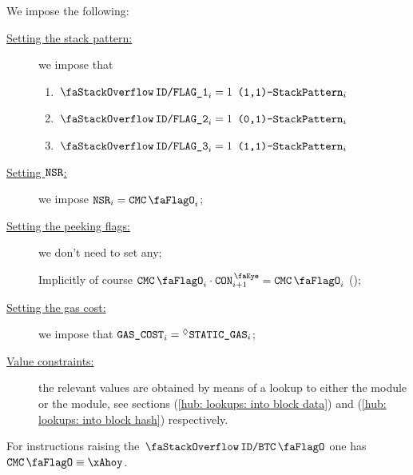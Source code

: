 \begin{center}
\end{center}
We impose the following:
\begin{description}
	\item[\underline{Setting the stack pattern:}]
		we impose that
	\begin{enumerate}
		\item \If $\decFlag{1} _{i} = 1$ \Then $\texttt{(1,1)-}\texttt{StackPattern}  _{i}$
		\item \If $\decFlag{2} _{i} = 1$ \Then $\texttt{(0,1)-}\texttt{StackPattern} _{i}$
		\item \If $\decFlag{3} _{i} = 1$ \Then $\texttt{(1,1)-}\texttt{StackPattern}  _{i}$
	\end{enumerate}
	\item[\underline{Setting $\texttt{NSR}$:}]
		we impose $\nonStackRows_{i} = \cmc_{i}$;
	\item[\underline{Setting the peeking flags:}]
		we don't need to set any;

		\saNote{}
		Implicitly of course $\cmc_{i} \cdot \peekContext_{i + 1} = \cmc_{i}$ (\sanityCheck);
	\item[\underline{Setting the gas cost:}]
		we impose that $\texttt{GAS}\texttt{\_COST}_{i} = \prescript{\lozenge}{}{\texttt{STATIC\_GAS}}_{i}$;
	\item[\underline{Value constraints:}]
		the relevant values are obtained by means of a lookup to either the \btcMod{} module or the \blockHashMod{} module,
		see sections
		(\ref{hub: lookups: into block data}) and
		(\ref{hub: lookups: into block hash}) respectively.
\end{description}
\saNote{}
For instructions raising the $\stackDecBtcFlag$ one has $\cmc \equiv \xAhoy$.
